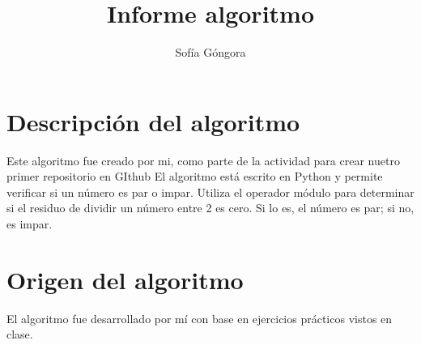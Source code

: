\documentclass{article}
\title{Informe algoritmo}
\author{Sofía Góngora}
\begin{document}
\maketitle

\section{Descripción del algoritmo}
Este algoritmo fue creado por mi, como parte de la actividad para crear nuetro primer repositorio en GIthub El algoritmo está escrito en Python y permite verificar si un número es par o impar. Utiliza el operador módulo  para determinar si el residuo de dividir un número entre 2 es cero. Si lo es, el número es par; si no, es impar.
\section{Origen del algoritmo}
El algoritmo fue desarrollado por mí con base en ejercicios prácticos vistos en clase.
\end{document}
